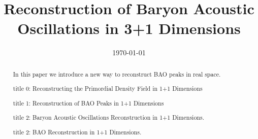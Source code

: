 \documentclass[aps,prd,twocolumn,showpacs,superscriptaddress,groupedaddress,nofootinbib]{revtex4}  %
\begin{document}
\widetext


\title{Reconstruction of Baryon Acoustic Oscillations in 3+1 Dimensions}

%
%
%

\date{\today}

\begin{abstract}
In this paper we introduce a new way to reconstruct BAO peaks in real space.

title 0: Reconstructing the Primordial Density Field in 1+1 Dimensions

title 1: Reconstruction of BAO Peaks in 1+1 Dimensions

title 2: Baryon Acoustic Oscillations Reconstruction in 1+1 Dimensions.

title 2: BAO Reconstruction in 1+1 Dimensions.

\end{abstract}

\pacs{}
\maketitle
\end{document}
